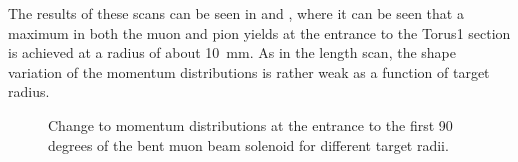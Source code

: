 The results of these scans can be seen in  and ,
where it can be seen that a maximum in both the muon and pion yields at the entrance to the Torus1 section is achieved at a radius of about 10~mm.
As in the length scan, the shape variation of the momentum distributions is rather weak as a function of target radius.

\begin{figure}[t]
\centering
{}
\caption{
Change to momentum distributions at the entrance to the first 90 degrees of the bent muon beam solenoid for different target radii.
}
\label{optimisation:ProdTgtSec:Radius:Momentum}
\end{figure}

